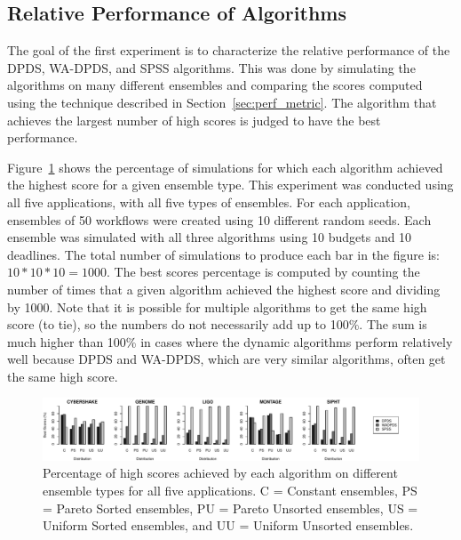 \documentclass[conference]{IEEEtran}
\begin{document}
\subsection{Relative Performance of Algorithms}

The goal of the first experiment is to characterize the relative performance of the DPDS, WA-DPDS, and SPSS algorithms. This was done by simulating the algorithms on many different ensembles and comparing the scores computed using the technique described in Section~\ref{sec:perf_metric}. The algorithm that achieves the largest number of high scores is judged to have the best performance.

Figure~\ref{fig:distributions} shows the percentage of simulations for which each algorithm achieved the highest score for a given ensemble type. This experiment was conducted using all five applications, with all five types of ensembles. For each application, ensembles of 50 workflows were created using 10 different random seeds. Each ensemble was simulated with all three algorithms using 10 budgets and 10 deadlines. The total number of simulations to produce each bar in the figure is: $10 * 10 * 10 = 1000$. The best scores percentage is computed by counting the number of times that a given algorithm achieved the highest score and dividing by 1000. Note that it is possible for multiple algorithms to get the same high score (to tie), so the numbers do not necessarily add up to 100\%. The sum is much higher than 100\% in cases where the dynamic algorithms perform relatively well because DPDS and WA-DPDS, which are very similar algorithms, often get the same high score.

\begin{figure}[ht]
    \centering
    \includegraphics[width=1.06\textwidth]{run-finish-variations-test-0-output-distributions}
    \caption[Percentage of high scores achieved by each algorithm on different ensemble types for all five applications.]{Percentage of high scores achieved by each algorithm on different ensemble types for all five applications. C = Constant ensembles, PS = Pareto Sorted ensembles, PU = Pareto Unsorted ensembles, US = Uniform Sorted ensembles, and UU = Uniform Unsorted ensembles.}
    \label{fig:distributions}
\end{figure}
\end{document}
